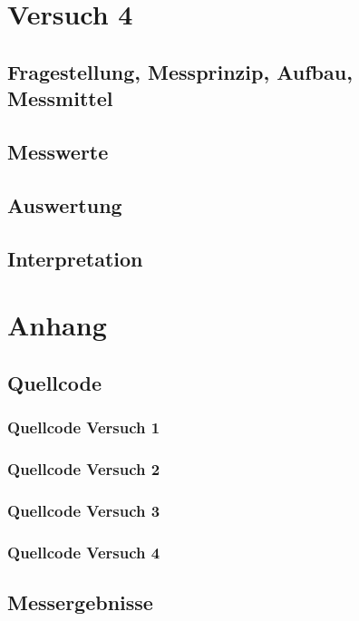 \documentclass[12pt, oneside, a4paper, \docLanguage]{report}
\begin{document}
%
%
\chapter{Versuch 4}
\label{chap:VERSUCH_4}

\section{Fragestellung, Messprinzip, Aufbau, Messmittel}
\label{chap:VERSUCH_4_FRAGESTELLUNG}

\section{Messwerte}
\label{chap:VERSUCH_4_MESSWERTE}

\section{Auswertung}
\label{chap:VERSUCH_4_AUSWERTUNG}

\section{Interpretation}
\label{chap:VERSUCH_4_INTERPRETATION}
%
%
\renewcommand\thesection{A.\arabic{section}}
\renewcommand\thesubsection{\thesection.\arabic{subsection}}

\chapter*{Anhang}
\label{chap:APPENDIX}
\addtocounter{chapter}{1}
\setcounter{section}{0}

\section{Quellcode}
\label{chap:APPENDIX_SOURCECODE}

\subsection{Quellcode Versuch 1}
\label{chap:APPENDIX_SOURCECODE_V1}

\subsection{Quellcode Versuch 2}
\label{chap:APPENDIX_SOURCECODE_V2}

\subsection{Quellcode Versuch 3}
\label{chap:APPENDIX_SOURCECODE_V3}

\subsection{Quellcode Versuch 4}
\label{chap:APPENDIX_SOURCECODE_V4}


\section{Messergebnisse}
\label{chap:APPENDIX_MEASUREMENT_SOURCE}

%
%

\end{document}
